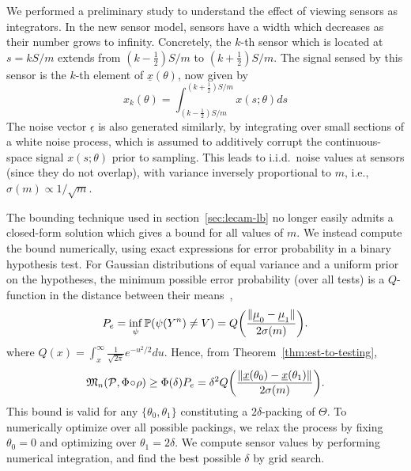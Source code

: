 \documentclass[conference]{IEEEtran}
\providecommand{\v}{}
\renewcommand{\v}[1]{\underline{#1}}
\DeclarePairedDelimiter\norm{\lVert}{\rVert}
\newcommand{\Phiorho}{\Phi\!\circ\!\rho}
\begin{document}
We performed a preliminary study to understand the effect of viewing sensors as
integrators. In the new sensor model, sensors have a width which decreases as
their number grows to infinity. Concretely, the $k$-th sensor which is located
at $s = kS/m$ extends from $(k{-}\frac{1}{2})S/m$ to $(k{+}\frac{1}{2})S/m$.
The signal sensed by this sensor is the $k$-th element of $\v x(\theta)$, now
given by
\begin{equation}
	x_k(\theta) = \int_{(k-\frac{1}{2})S/m}^{(k+\frac{1}{2})S/m} x(s;\theta) ds
\end{equation}
The noise vector $\v \epsilon$ is also generated similarly, by integrating over
small sections of a white noise process, which is assumed to additively corrupt
the continuous-space signal $x(s;\theta)$ prior to sampling. This leads to
i.i.d.\ noise values at sensors (since they do not overlap), with variance
inversely proportional to $m$, i.e., $\sigma(m) \propto 1/\sqrt{m}$.

The bounding technique used in section~\ref{sec:lecam-lb} no longer easily
admits a closed-form solution which gives a bound for all values of $m$. We
instead compute the bound numerically, using exact expressions for error
probability in a binary hypothesis test. For Gaussian distributions of equal
variance and a uniform prior on the hypotheses, the minimum possible error
probability (over all tests) is a $Q$-function in the distance between their
means~\cite{NPLemmaOrSimilar},
\begin{equation}
	P_e = \inf_\psi \mathbb P(\psi(Y^n) \neq V) = Q\bigg(\frac{\norm{\v\mu_0 - \v\mu_1}}{2\sigma(m)}\bigg).
\end{equation}
where $Q(x) = \int_x^\infty \frac{1}{\sqrt{2\pi}} e^{-u^2/2} du$. Hence, from
Theorem~\ref{thm:est-to-testing},
\begin{equation}
	\mathfrak{M}_n(\mathcal{P}, \Phiorho) \geq \Phi(\delta) P_e = \delta^2 Q\bigg(\frac{\norm{\v x(\theta_0) - \v x(\theta_1)}}{2\sigma(m)}\bigg).
\end{equation}
This bound is valid for any $\{\theta_0, \theta_1\}$ constituting a
$2\delta$-packing of $\Theta$. To numerically optimize over all possible
packings, we relax the process by fixing $\theta_0 = 0$ and optimizing over
$\theta_1 = 2\delta$.  We compute sensor values by performing numerical
integration, and find the best possible $\delta$ by grid search.

\end{document}
